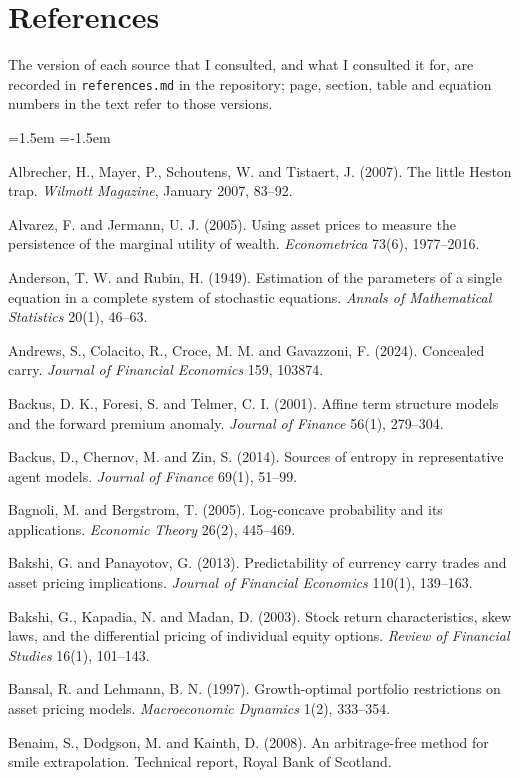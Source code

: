 \documentclass[11pt]{article}
\theoremstyle{result}
\begin{document}
\section*{References}
The version of each source that I consulted, and what I consulted it for, are recorded in \texttt{references.md} in the repository; page, section, table and equation numbers in the text refer to those versions.

\smallskip
\begin{list}{}{\leftmargin=1.5em \itemindent=-1.5em \itemsep=2pt \parsep=0pt}\small
\item Albrecher, H., Mayer, P., Schoutens, W. and Tistaert, J. (2007). The little Heston trap. \emph{Wilmott Magazine}, January 2007, 83--92.
\item Alvarez, F. and Jermann, U. J. (2005). Using asset prices to measure the persistence of the marginal utility of wealth. \emph{Econometrica} 73(6), 1977--2016.
\item Anderson, T. W. and Rubin, H. (1949). Estimation of the parameters of a single equation in a complete system of stochastic equations. \emph{Annals of Mathematical Statistics} 20(1), 46--63.
\item Andrews, S., Colacito, R., Croce, M. M. and Gavazzoni, F. (2024). Concealed carry. \emph{Journal of Financial Economics} 159, 103874.
\item Backus, D. K., Foresi, S. and Telmer, C. I. (2001). Affine term structure models and the forward premium anomaly. \emph{Journal of Finance} 56(1), 279--304.
\item Backus, D., Chernov, M. and Zin, S. (2014). Sources of entropy in representative agent models. \emph{Journal of Finance} 69(1), 51--99.
\item Bagnoli, M. and Bergstrom, T. (2005). Log-concave probability and its applications. \emph{Economic Theory} 26(2), 445--469.
\item Bakshi, G. and Panayotov, G. (2013). Predictability of currency carry trades and asset pricing implications. \emph{Journal of Financial Economics} 110(1), 139--163.
\item Bakshi, G., Kapadia, N. and Madan, D. (2003). Stock return characteristics, skew laws, and the differential pricing of individual equity options. \emph{Review of Financial Studies} 16(1), 101--143.
\item Bansal, R. and Lehmann, B. N. (1997). Growth-optimal portfolio restrictions on asset pricing models. \emph{Macroeconomic Dynamics} 1(2), 333--354.
\item Benaim, S., Dodgson, M. and Kainth, D. (2008). An arbitrage-free method for smile extrapolation. Technical report, Royal Bank of Scotland.

\end{list}
\end{document}
